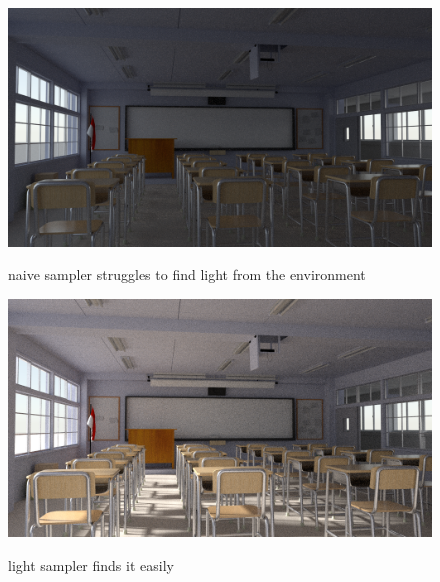 \documentclass[12pt]{report}
\begin{document}
    \begin{figure}[h]
        \caption{naive sampler struggles to find light from the environment}
        \includegraphics[width=\textwidth]{classroom_naive}
        \centering
        \label{fig:classroom_naive}
    \end{figure}
    \begin{figure}[h]
        \caption{light sampler finds it easily}
        \includegraphics[width=\textwidth]{classroom_path}
        \centering
        \label{fig:classroom_path}
    \end{figure}
\end{document}
